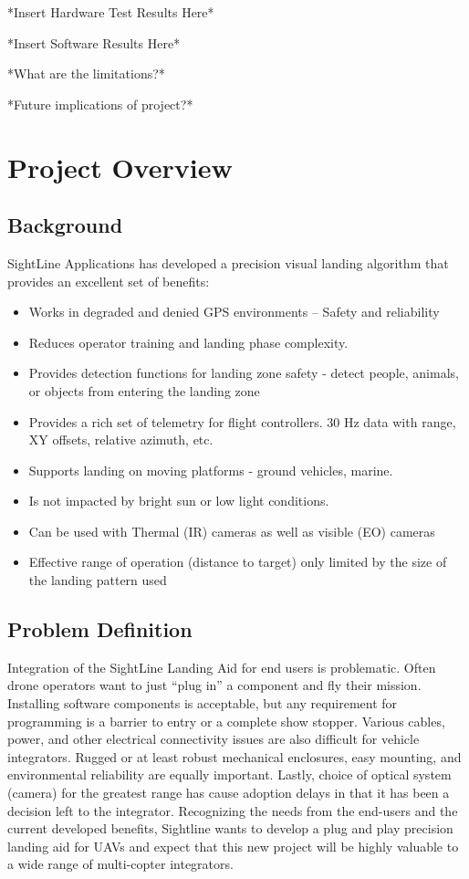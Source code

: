 \documentclass[11pt]{article}
\begin{document}
*Insert Hardware Test Results Here*

*Insert Software Results Here*

*What are the limitations?*

*Future implications of project?*

\pagebreak

\tableofcontents

\pagebreak

\listoffigures

\pagebreak

\section{Project Overview}
\subsection{Background}
SightLine Applications has developed a precision visual landing algorithm that provides an excellent set of benefits:
\begin{itemize}
\item Works in degraded and denied GPS environments – Safety and reliability
\item	Reduces operator training and landing phase complexity.
\item	Provides detection functions for landing zone safety - detect people, animals, or objects from entering the landing zone
\item   Provides a rich set of telemetry for flight controllers.  30 Hz data with range, XY offsets, relative azimuth, etc.
\item	Supports landing on moving platforms - ground vehicles, marine.
\item	Is not impacted by bright sun or low light conditions.
\item	Can be used with Thermal (IR) cameras as well as visible (EO) cameras
\item	Effective range of operation (distance to target) only limited by the size of the landing pattern used
\end{itemize}

\subsection{Problem Definition}
Integration of the SightLine Landing Aid for end users is problematic.  Often drone operators want to just “plug in” a component and fly their mission.  Installing software components is acceptable, but any requirement for programming is a barrier to entry or a complete show stopper.  Various cables, power, and other electrical connectivity issues are also difficult for vehicle integrators.  Rugged or at least robust mechanical enclosures, easy mounting, and environmental reliability are equally important.  Lastly, choice of optical system (camera) for the greatest range has cause adoption delays in that it has been a decision left to the integrator. Recognizing the needs from the end-users and the current developed benefits, Sightline wants to develop a plug and play precision landing aid for UAVs and expect that this new project will be highly valuable to a wide range of multi-copter integrators.
\end{document}
